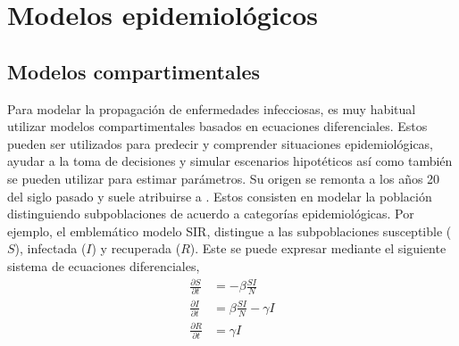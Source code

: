 \chapter{Modelos epidemiológicos} \label{chp:epi_models}

\section{Modelos compartimentales}

Para modelar la propagación de enfermedades infecciosas, es muy habitual utilizar modelos compartimentales basados en ecuaciones diferenciales. Estos pueden ser utilizados para predecir y comprender situaciones epidemiológicas, ayudar a la toma de decisiones y simular escenarios hipotéticos así como también se pueden utilizar para estimar parámetros. Su origen se remonta a los años 20 del siglo pasado y suele atribuirse a \cite{Kermack1927}. Estos consisten en modelar la población distinguiendo subpoblaciones de acuerdo a categorías epidemiológicas. Por ejemplo, el emblemático modelo SIR, distingue a las subpoblaciones susceptible ($S$), infectada ($I$) y recuperada ($R$). Este se puede expresar mediante el siguiente sistema de ecuaciones diferenciales,
\begin{align} \label{eq:sir}
    \frac{\partial S}{\partial t} &= -\beta \frac{SI}{N}\\
    \frac{\partial I}{\partial t} &= \beta \frac{SI}{N} - \gamma I \\
    \frac{\partial R}{\partial t} &= \gamma I
\end{align}
